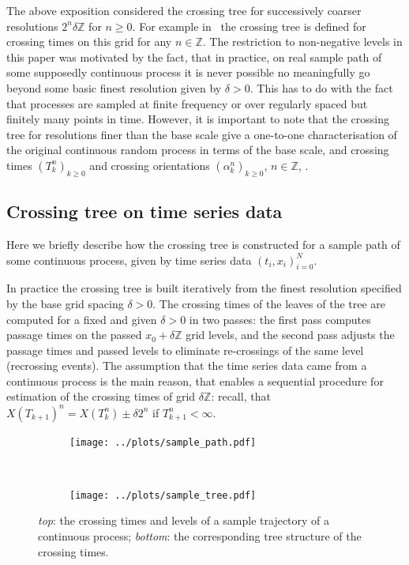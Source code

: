\documentclass[a4paper]{article}
\begin{document}
The above exposition considered the crossing tree for successively coarser resolutions
$2^n\delta \mathbb{Z}$ for $n\geq0$. For example in~\cite{decrouez2013estimation}
the crossing tree is defined for crossing times on this grid for any $n\in\mathbb{Z}$.
The restriction to non-negative levels in this paper was motivated by the fact,
that in practice, on real sample path of some supposedly continuous process it
is never possible no meaningfully go beyond some basic finest resolution given
by $\delta>0$. This has to do with the fact that processes are sampled at finite
frequency or over regularly spaced but finitely many points in time. However, it
is important to note that the crossing tree for resolutions finer than the base
scale give a one-to-one characterisation of the original continuous random process
in terms of the base scale, and crossing times $(T_k^n)_{k\geq 0}$ and crossing
orientations $(\alpha_k^n)_{k\geq 0}$, $n\in \mathbb{Z}$, \cite{decrouez2013estimation, ECP1673}.


\subsection{Crossing tree on time series data} %
\label{sub:crossing_tree_on_time_series_data}

Here we briefly describe how the crossing tree is constructed for a sample
path of some continuous process, given by time series data $(t_i, x_i)_{i=0}^N$.

In practice the crossing tree is built iteratively from the finest resolution
specified by the base grid spacing $\delta > 0$. The crossing times of the leaves
of the tree are computed for a fixed and given $\delta>0$ in two passes: the first
pass computes passage times on the passed $x_0+\delta \mathbb{Z}$ grid levels, and
the second pass adjusts the passage times and passed levels to eliminate re-crossings
of the same level (recrossing events). The assumption that the time series data
came from a continuous process is the main reason, that enables a sequential procedure
for estimation of the crossing times of grid $\delta\mathbb{Z}$: recall, that
$X(T_{k+1})^n = X(T_k^n) \pm\delta2^n$ if $T_{k+1}^n<\infty$.

\begin{figure}[ht]
    \centering
    \begin{subfigure}{\linewidth}
        \texttt{[image: ../plots/sample\_path.pdf]}
    \end{subfigure}\\
    \vspace{-20pt}
    \begin{subfigure}{\linewidth}
        \texttt{[image: ../plots/sample\_tree.pdf]}
    \end{subfigure}
    \vspace{-10pt}
    \caption{\emph{top}: the crossing times and levels of a sample trajectory of
    a continuous process; \emph{bottom}: the corresponding tree structure of the
    crossing times.}
    \label{fig:sample_tree}
\end{figure}
\end{document}
